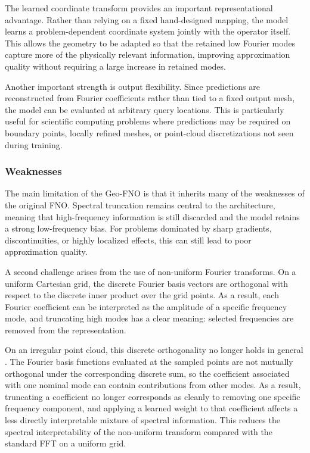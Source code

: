 The learned coordinate transform provides an important representational advantage. Rather than relying on a fixed hand\hyp{}designed mapping, the model learns a problem\hyp{}dependent coordinate system jointly with the operator itself. This allows the geometry to be adapted so that the retained low Fourier modes capture more of the physically relevant information, improving approximation quality without requiring a large increase in retained modes.

Another important strength is output flexibility. Since predictions are reconstructed from Fourier coefficients rather than tied to a fixed output mesh, the model can be evaluated at arbitrary query locations. This is particularly useful for scientific computing problems where predictions may be required on boundary points, locally refined meshes, or point-cloud discretizations not seen during training.


\subsubsection{Weaknesses}

The main limitation of the Geo-FNO is that it inherits many of the weaknesses of the original FNO. Spectral truncation remains central to the architecture, meaning that high-frequency information is still discarded and the model retains a strong low-frequency bias. For problems dominated by sharp gradients, discontinuities, or highly localized effects, this can still lead to poor approximation quality.

A second challenge arises from the use of non-uniform Fourier transforms. On a uniform Cartesian grid, the discrete Fourier basis vectors are orthogonal with respect to the discrete inner product over the grid points. As a result, each Fourier coefficient can be interpreted as the amplitude of a specific frequency mode, and truncating high modes has a clear meaning: selected frequencies are removed from the representation.

On an irregular point cloud, this discrete orthogonality no longer holds in general \cite{nonuniform-fft}. The Fourier basis functions evaluated at the sampled points are not mutually orthogonal under the corresponding discrete sum, so the coefficient associated with one nominal mode can contain contributions from other modes. As a result, truncating a coefficient no longer corresponds as cleanly to removing one specific frequency component, and applying a learned weight to that coefficient affects a less directly interpretable mixture of spectral information. This reduces the spectral interpretability of the non-uniform transform compared with the standard FFT on a uniform grid.

